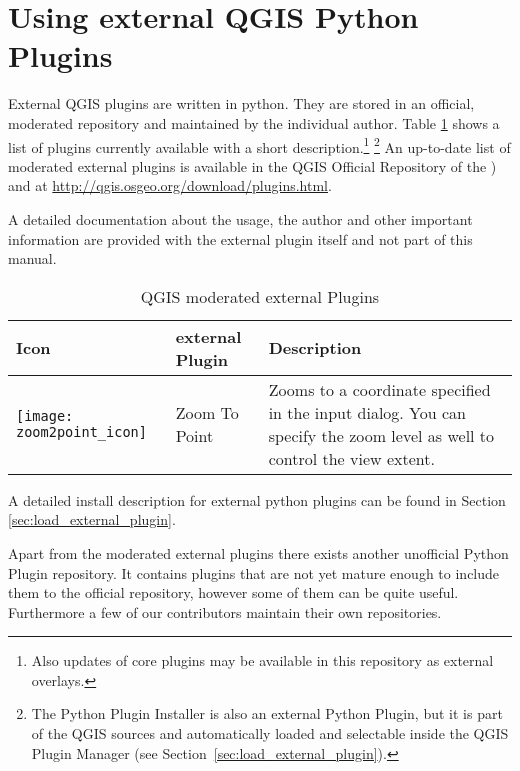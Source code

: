 
\section{Using external QGIS Python Plugins}\label{sec:external_plugins}

\updatedisclaimer

External QGIS plugins are written in python. They are stored in 
an official, moderated repository and maintained by the individual 
author. Table \ref{tab:external_plugins} shows a list of plugins 
currently available with a short description.\footnote{Also updates of 
core plugins may be available in this repository as external overlays.} 
\footnote{The Python Plugin Installer is also an external Python Plugin, but 
it is part of the QGIS sources and automatically loaded and selectable inside
the QGIS Plugin Manager (see Section~\ref{sec:load_external_plugin}).}
An up-to-date list of moderated external plugins is available in the 
QGIS Official Repository of the
) and at 
\url{http://qgis.osgeo.org/download/plugins.html}. 

A detailed documentation about the usage, the author and other important
information are provided with the external plugin itself and not part of this
manual. 

\begin{table}[H]
\centering
\caption{QGIS moderated external Plugins}\label{tab:external_plugins}\medskip
\small
 \begin{tabular}{|l|l|p{4in}|}
\hline \textbf{Icon} & \textbf{external Plugin} & \textbf{Description}\\
\hline
\texttt{[image: zoom2point\_icon]}
 & Zoom To Point \index{plugins!Zoom To Point} & Zooms to a coordinate 
  specified in the input dialog. You can specify the zoom level as well to 
  control the view extent.\\
\hline
\end{tabular}
\end{table}

A detailed install description for external python plugins can be found in 
Section \ref{sec:load_external_plugin}.


Apart from the moderated external plugins there exists another unofficial
Python Plugin repository. It contains plugins that are not yet mature
enough to include them to the official repository, however some of them
can be quite useful. Furthermore a few of our contributors maintain
their own repositories.

